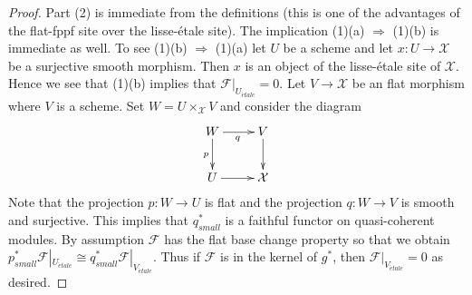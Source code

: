 \documentclass[10pt,a4paper]{amsart}
\theoremstyle{plain}
\theoremstyle{definition}
\theoremstyle{remark}
\numberwithin{equation}{subsection}
\def\etale{{\acute{e}tale}}
\begin{document}
\begin{proof}
Part (2) is immediate from the definitions (this is one of the advantages
of the flat-fppf site over the lisse-\'etale site). The implication
(1)(a) $\Rightarrow$ (1)(b) is immediate as well. To see (1)(b)
$\Rightarrow$ (1)(a) let $U$ be a scheme and let $x : U \to \mathcal{X}$
be a surjective smooth morphism. Then $x$ is an object of the
lisse-\'etale site of $\mathcal{X}$. Hence we see that (1)(b)
implies that $\mathcal{F}|_{U_\etale} = 0$. Let $V \to \mathcal{X}$
be an flat morphism where $V$ is a scheme. Set $W = U \times_\mathcal{X} V$
and consider the diagram
$$
\xymatrix{
W \ar[d]_p \ar[r]_q & V \ar[d] \\
U \ar[r] & \mathcal{X}
}
$$
Note that the projection $p : W \to U$ is flat and the projection
$q : W \to V$ is smooth and surjective. This implies that $q_{small}^*$
is a faithful functor on quasi-coherent modules. By assumption $\mathcal{F}$
has the flat base change property so that we obtain
$p_{small}^*\mathcal{F}|_{U_\etale} \cong
q_{small}^*\mathcal{F}|_{V_\etale}$. Thus if $\mathcal{F}$
is in the kernel of $g^*$, then $\mathcal{F}|_{V_\etale} = 0$
as desired.
\end{proof}
\end{document}
